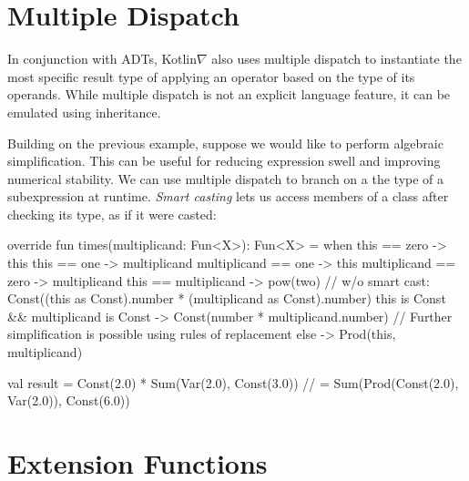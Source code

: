 \documentclass[12pt,initial,twoside,maitrise]{dms}
\numberwithin{equation}{section}
\numberwithin{table}{chapter}
\numberwithin{figure}{chapter}
\begin{document}
\section{Multiple Dispatch}\label{sec:multiple-dispatch}

In conjunction with ADTs, Kotlin$\nabla$ also uses multiple dispatch to instantiate the most specific result type of applying an operator based on the type of its operands. While multiple dispatch is not an explicit language feature, it can be emulated using inheritance.

Building on the previous example, suppose we would like to perform algebraic simplification. This can be useful for reducing expression swell and improving numerical stability. We can use multiple dispatch to branch on a the type of a subexpression at runtime. \textit{Smart casting} lets us access  members of a class after checking its type, as if it were casted:

\begin{mylisting}[caption={Multiple dispatch allows us to put all related control flow on a single abstract class which is inherited by subclasses, simplifying readability, debugging and refactoring.}, language=Kotlin]
override fun times(multiplicand: Fun<X>): Fun<X> =
    when {
        this == zero -> this
        this == one -> multiplicand
        multiplicand == one -> this
        multiplicand == zero -> multiplicand
        this == multiplicand -> pow(two)
        // w/o smart cast: Const((this as Const).number * (multiplicand as Const).number)
        this is Const && multiplicand is Const -> Const(number * multiplicand.number)
        // Further simplification is possible using rules of replacement
        else -> Prod(this, multiplicand)
    }

val result = Const(2.0) * Sum(Var(2.0), Const(3.0))
//         = Sum(Prod(Const(2.0), Var(2.0)), Const(6.0))
\end{mylisting}

\section{Extension Functions}\label{sec:extension-functions}
\end{document}
